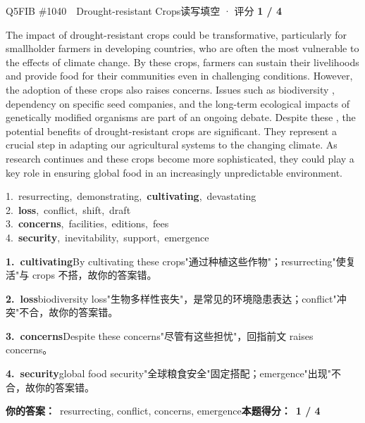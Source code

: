\begin{qblock}{Q5\quad FIB \#1040\ \ Drought-resistant Crops}{读写填空 · 评分 \textcolor{cAccent}{\bfseries 1 / 4}}
\begin{promptbox}
The impact of drought-resistant crops could be transformative, particularly for smallholder farmers in developing countries, who are often the most vulnerable to the effects of climate change. By  these crops, farmers can sustain their livelihoods and provide food for their communities even in challenging conditions. However, the adoption of these crops also raises concerns. Issues such as biodiversity , dependency on specific seed companies, and the long-term ecological impacts of genetically modified organisms are part of an ongoing debate. Despite these , the potential benefits of drought-resistant crops are significant. They represent a crucial step in adapting our agricultural systems to the changing climate. As research continues and these crops become more sophisticated, they could play a key role in ensuring global food  in an increasingly unpredictable environment.
\end{promptbox}
{\small
1.\ resurrecting,\ demonstrating,\ \textbf{cultivating},\ devastating\\
2.\ \textbf{loss},\ conflict,\ shift,\ draft\\
3.\ \textbf{concerns},\ facilities,\ editions,\ fees\\
4.\ \textbf{security},\ inevitability,\ support,\ emergence}
\begin{notebox}\footnotesize
\textbf{1.\ cultivating}\quad By cultivating these crops"通过种植这些作物"；resurrecting"使复活"与 crops 不搭，故你的答案错。\par\smallskip
\textbf{2.\ loss}\quad biodiversity loss"生物多样性丧失"，是常见的环境隐患表达；conflict"冲突"不合，故你的答案错。\par\smallskip
\textbf{3.\ concerns}\quad Despite these concerns"尽管有这些担忧"，回指前文 raises concerns。\par\smallskip
\textbf{4.\ security}\quad global food security"全球粮食安全"固定搭配；emergence"出现"不合，故你的答案错。
\end{notebox}
\smallskip
\textbf{你的答案：}\ {\color{cWrong}resurrecting, conflict}, concerns, {\color{cWrong}emergence}\qquad\textbf{本题得分：}\ {\color{cAccent}\bfseries 1 / 4}
\end{qblock}

